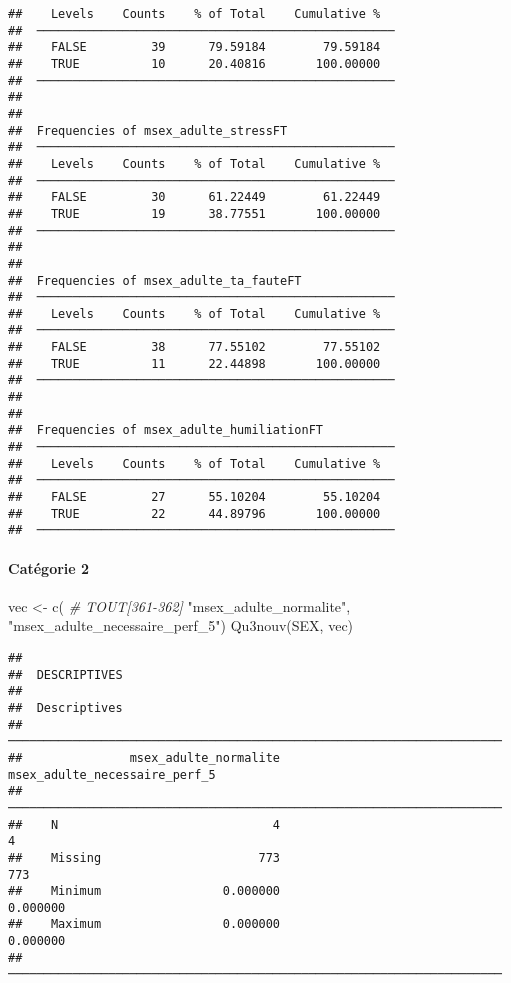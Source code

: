 \documentclass[
]{article}
\newenvironment{Shaded}{\begin{snugshade}}{\end{snugshade}}
\newcommand{\CommentTok}[1]{\textcolor[rgb]{0.56,0.35,0.01}{\textit{#1}}}
\newcommand{\FunctionTok}[1]{\textcolor[rgb]{0.00,0.00,0.00}{#1}}
\newcommand{\NormalTok}[1]{#1}
\newcommand{\OtherTok}[1]{\textcolor[rgb]{0.56,0.35,0.01}{#1}}
\newcommand{\StringTok}[1]{\textcolor[rgb]{0.31,0.60,0.02}{#1}}
\begin{document}
\begin{verbatim}
##    Levels    Counts    % of Total    Cumulative %   
##  ────────────────────────────────────────────────── 
##    FALSE         39      79.59184        79.59184   
##    TRUE          10      20.40816       100.00000   
##  ────────────────────────────────────────────────── 
## 
## 
##  Frequencies of msex_adulte_stressFT                
##  ────────────────────────────────────────────────── 
##    Levels    Counts    % of Total    Cumulative %   
##  ────────────────────────────────────────────────── 
##    FALSE         30      61.22449        61.22449   
##    TRUE          19      38.77551       100.00000   
##  ────────────────────────────────────────────────── 
## 
## 
##  Frequencies of msex_adulte_ta_fauteFT              
##  ────────────────────────────────────────────────── 
##    Levels    Counts    % of Total    Cumulative %   
##  ────────────────────────────────────────────────── 
##    FALSE         38      77.55102        77.55102   
##    TRUE          11      22.44898       100.00000   
##  ────────────────────────────────────────────────── 
## 
## 
##  Frequencies of msex_adulte_humiliationFT           
##  ────────────────────────────────────────────────── 
##    Levels    Counts    % of Total    Cumulative %   
##  ────────────────────────────────────────────────── 
##    FALSE         27      55.10204        55.10204   
##    TRUE          22      44.89796       100.00000   
##  ──────────────────────────────────────────────────
\end{verbatim}

\hypertarget{catuxe9gorie-2-4}{%
\paragraph{Catégorie 2}\label{catuxe9gorie-2-4}}

\begin{Shaded}
\begin{Highlighting}[]
\NormalTok{vec }\OtherTok{\textless{}{-}} \FunctionTok{c}\NormalTok{(  }\CommentTok{\# TOUT[361{-}362]}
  \StringTok{"msex\_adulte\_normalite"}\NormalTok{,}
  \StringTok{"msex\_adulte\_necessaire\_perf\_5"}\NormalTok{)}
\FunctionTok{Qu3nouv}\NormalTok{(SEX, vec)}
\end{Highlighting}
\end{Shaded}

\begin{verbatim}
## 
##  DESCRIPTIVES
## 
##  Descriptives                                                          
##  ───────────────────────────────────────────────────────────────────── 
##               msex_adulte_normalite    msex_adulte_necessaire_perf_5   
##  ───────────────────────────────────────────────────────────────────── 
##    N                              4                                4   
##    Missing                      773                              773   
##    Minimum                 0.000000                         0.000000   
##    Maximum                 0.000000                         0.000000   
##  ─────────────────────────────────────────────────────────────────────
\end{verbatim}
\end{document}
